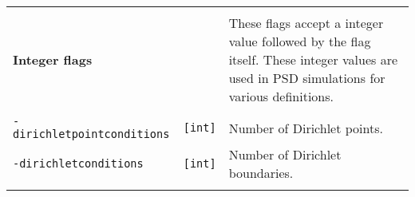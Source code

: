 \begin{longtable}[]{@{}lll@{}}
\begin{minipage}[t]{0.09\columnwidth}
\strut
\end{minipage} & \begin{minipage}[t]{0.56\columnwidth}\raggedright\strut
\strut
\end{minipage}\tabularnewline
\begin{minipage}[t]{0.26\columnwidth}\raggedright\strut
\textbf{Integer flags}\strut
\end{minipage} & \begin{minipage}[t]{0.09\columnwidth}\raggedright\strut
\strut
\end{minipage} & \begin{minipage}[t]{0.56\columnwidth}\raggedright\strut
These flags accept a integer value followed by the flag itself. These
integer values are used in PSD simulations for various
definitions.\strut
\end{minipage}\tabularnewline
\begin{minipage}[t]{0.26\columnwidth}\raggedright\strut
\strut
\end{minipage} & \begin{minipage}[t]{0.09\columnwidth}\raggedright\strut
\strut
\end{minipage} & \begin{minipage}[t]{0.56\columnwidth}\raggedright\strut
\strut
\end{minipage}\tabularnewline
\begin{minipage}[t]{0.26\columnwidth}\raggedright\strut
\lstinline!-dirichletpointconditions!\strut
\end{minipage} & \begin{minipage}[t]{0.09\columnwidth}\raggedright\strut
\lstinline![int]!\strut
\end{minipage} & \begin{minipage}[t]{0.56\columnwidth}\raggedright\strut
Number of Dirichlet points. \strut
\end{minipage}\tabularnewline
\begin{minipage}[t]{0.26\columnwidth}\raggedright\strut
\lstinline!-dirichletconditions!\strut
\end{minipage} & \begin{minipage}[t]{0.09\columnwidth}\raggedright\strut
\lstinline![int]!\strut
\end{minipage} & \begin{minipage}[t]{0.56\columnwidth}\raggedright\strut
Number of Dirichlet boundaries.\strut
\end{minipage}\tabularnewline
\begin{minipage}[t]{0.26\columnwidth}\raggedright\strut

\end{minipage}
\end{longtable}
